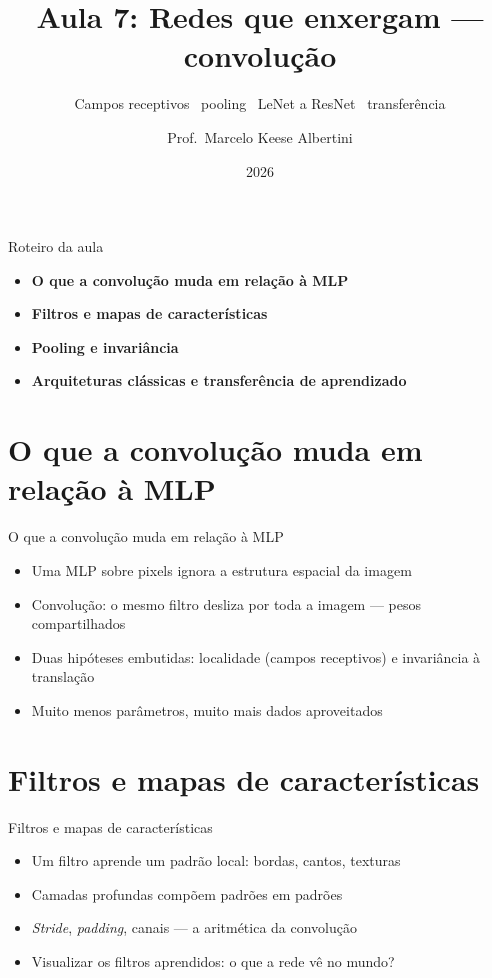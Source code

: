 \documentclass[aspectratio=169, 11pt]{beamer}
\title[Aula 7 — Convolução]{Aula 7: Redes que enxergam — convolução}
\subtitle[GBC073 — Inteligência Computacional]{Campos receptivos \textbullet\ pooling \textbullet\ LeNet a ResNet \textbullet\ transferência}
\author[Prof.\ Marcelo Albertini]{Prof.\ Marcelo Keese Albertini}
\institute{GBC073 — Inteligência Computacional \textbullet\ Universidade Federal de Uberlândia}
\date{2026}
\begin{document}
\begin{frame}
  \titlepage
\end{frame}

\begin{frame}{Roteiro da aula}
  \begin{itemize}\setlength{\itemsep}{0.5ex}
    \item<1-> \textbf{O que a convolução muda em relação à MLP}
    \item<2-> \textbf{Filtros e mapas de características}
    \item<3-> \textbf{Pooling e invariância}
    \item<4-> \textbf{Arquiteturas clássicas e transferência de aprendizado}
  \end{itemize}
\end{frame}

\section{O que a convolução muda em relação à MLP}

\begin{frame}{O que a convolução muda em relação à MLP}
  \begin{itemize}\setlength{\itemsep}{0.4ex}
    \item Uma MLP sobre pixels ignora a estrutura espacial da imagem
    \item Convolução: o mesmo filtro desliza por toda a imagem — pesos
          compartilhados
    \item Duas hipóteses embutidas: localidade (campos receptivos) e
          invariância à translação
    \item Muito menos parâmetros, muito mais dados aproveitados
  \end{itemize}
\end{frame}

\section{Filtros e mapas de características}

\begin{frame}{Filtros e mapas de características}
  \begin{itemize}\setlength{\itemsep}{0.4ex}
    \item Um filtro aprende um padrão local: bordas, cantos, texturas
    \item Camadas profundas compõem padrões em padrões
    \item \emph{Stride}, \emph{padding}, canais — a aritmética da convolução
    \item Visualizar os filtros aprendidos: o que a rede vê no mundo?
  \end{itemize}
\end{frame}
\end{document}
